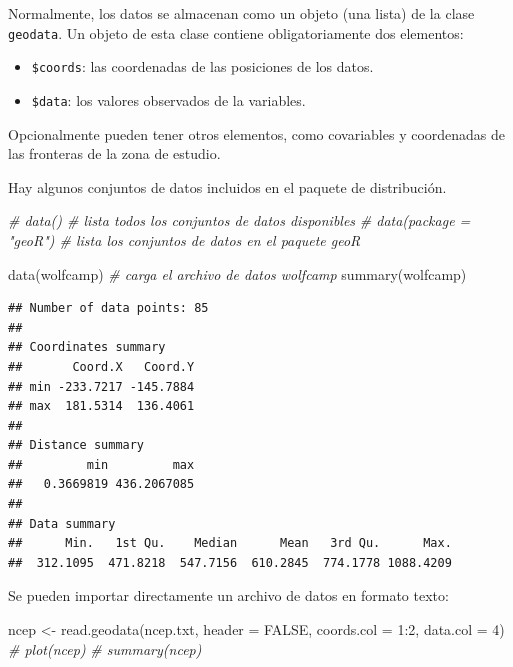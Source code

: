 \documentclass[
  spanish,
]{book}
\newenvironment{Shaded}{\begin{snugshade}}{\end{snugshade}}
\newcommand{\AttributeTok}[1]{\textcolor[rgb]{0.77,0.63,0.00}{#1}}
\newcommand{\CommentTok}[1]{\textcolor[rgb]{0.56,0.35,0.01}{\textit{#1}}}
\newcommand{\ConstantTok}[1]{\textcolor[rgb]{0.00,0.00,0.00}{#1}}
\newcommand{\DecValTok}[1]{\textcolor[rgb]{0.00,0.00,0.81}{#1}}
\newcommand{\FunctionTok}[1]{\textcolor[rgb]{0.00,0.00,0.00}{#1}}
\newcommand{\NormalTok}[1]{#1}
\newcommand{\OtherTok}[1]{\textcolor[rgb]{0.56,0.35,0.01}{#1}}
\newcommand{\SpecialCharTok}[1]{\textcolor[rgb]{0.00,0.00,0.00}{#1}}
\newcommand{\StringTok}[1]{\textcolor[rgb]{0.31,0.60,0.02}{#1}}
\theoremstyle{break}
\theoremstyle{definition}
\theoremstyle{definition}
\theoremstyle{definition}
\theoremstyle{definition}
\theoremstyle{remark}
\begin{document}
Normalmente, los datos se almacenan como un objeto (una lista) de la
clase \texttt{geodata}. Un objeto de esta clase contiene obligatoriamente dos
elementos:

\begin{itemize}
\item
  \texttt{\$coords}: las coordenadas de las posiciones de los datos.
\item
  \texttt{\$data}: los valores observados de la variables.
\end{itemize}

Opcionalmente pueden tener otros elementos, como covariables
y coordenadas de las fronteras de la zona de estudio.

Hay algunos conjuntos de datos incluidos en el paquete de distribución.

\begin{Shaded}
\begin{Highlighting}[]
\CommentTok{\# data()                    \# lista todos los conjuntos de datos disponibles}
\CommentTok{\# data(package = "geoR")    \# lista los conjuntos de datos en el paquete geoR}

\FunctionTok{data}\NormalTok{(wolfcamp)              }\CommentTok{\# carga el archivo de datos wolfcamp}
\FunctionTok{summary}\NormalTok{(wolfcamp)}
\end{Highlighting}
\end{Shaded}

\begin{verbatim}
## Number of data points: 85 
## 
## Coordinates summary
##       Coord.X   Coord.Y
## min -233.7217 -145.7884
## max  181.5314  136.4061
## 
## Distance summary
##         min         max 
##   0.3669819 436.2067085 
## 
## Data summary
##      Min.   1st Qu.    Median      Mean   3rd Qu.      Max. 
##  312.1095  471.8218  547.7156  610.2845  774.1778 1088.4209
\end{verbatim}

Se pueden importar directamente un archivo de datos en formato texto:

\begin{Shaded}
\begin{Highlighting}[]
\NormalTok{ncep }\OtherTok{\textless{}{-}} \FunctionTok{read.geodata}\NormalTok{(}\StringTok{\textquotesingle{}ncep.txt\textquotesingle{}}\NormalTok{, }\AttributeTok{header =} \ConstantTok{FALSE}\NormalTok{, }\AttributeTok{coords.col =} \DecValTok{1}\SpecialCharTok{:}\DecValTok{2}\NormalTok{, }\AttributeTok{data.col =} \DecValTok{4}\NormalTok{)}
\CommentTok{\# plot(ncep)}
\CommentTok{\# summary(ncep)}
\end{Highlighting}
\end{Shaded}
\end{document}
